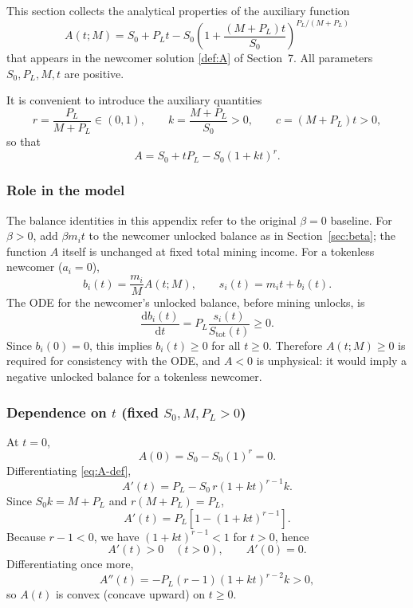 \documentclass[11pt,a4paper]{article}
\newcommand{\rmd}{\mathrm{d}}
\begin{document}
This section collects the analytical properties of the auxiliary function
\begin{equation}
\boxed{
A(t;M)=S_0+P_Lt-S_0\left(1+\frac{(M+P_L)t}{S_0}\right)^{P_L/(M+P_L)}
}
\label{eq:A-def}
\end{equation}
that appears in the newcomer solution \eqref{def:A} of Section~7. All parameters $S_0,P_L,M,t$ are positive.

It is convenient to introduce the auxiliary quantities
\begin{equation}
r=\frac{P_L}{M+P_L}\in(0,1),
\qquad
k=\frac{M+P_L}{S_0}>0,
\qquad
c=(M+P_L)t>0,
\end{equation}
so that
\begin{equation}
A=S_0+tP_L-S_0(1+kt)^r.
\end{equation}

\subsubsection{Role in the model}
The balance identities in this appendix refer to the original $\beta=0$ baseline. For $\beta>0$, add $\beta m_it$ to the newcomer unlocked balance as in Section~\ref{sec:beta}; the function $A$ itself is unchanged at fixed total mining income.
For a tokenless newcomer ($a_i=0$),
\begin{equation}
b_i(t)=\frac{m_i}{M}A(t;M),
\qquad
s_i(t)=m_it+b_i(t).
\end{equation}
The ODE for the newcomer's unlocked balance, before mining unlocks, is
\begin{equation}
\frac{\rmd b_i(t)}{\rmd t}=P_L\frac{s_i(t)}{S_{\mathrm{tot}}(t)}\ge0.
\end{equation}
Since $b_i(0)=0$, this implies $b_i(t)\ge0$ for all $t\ge0$. Therefore $A(t;M)\ge0$ is required for consistency with the ODE, and $A<0$ is unphysical: it would imply a negative unlocked balance for a tokenless newcomer.

\subsubsection{Dependence on $t$ (fixed $S_0,M,P_L>0$)}
At $t=0$,
\begin{equation}
A(0)=S_0-S_0(1)^r=0.
\end{equation}
Differentiating \eqref{eq:A-def},
\begin{equation}
A'(t)=P_L-S_0\,r(1+kt)^{r-1}k.
\end{equation}
Since $S_0k=M+P_L$ and $r(M+P_L)=P_L$,
\begin{equation}
\boxed{
A'(t)=P_L\left[1-(1+kt)^{r-1}\right].
}
\end{equation}
Because $r-1<0$, we have $(1+kt)^{r-1}<1$ for $t>0$, hence
\begin{equation}
A'(t)>0\quad(t>0),
\qquad
A'(0)=0.
\end{equation}
Differentiating once more,
\begin{equation}
A''(t)=-P_L(r-1)(1+kt)^{r-2}k>0,
\end{equation}
so $A(t)$ is convex (concave upward) on $t\ge0$.
\end{document}
